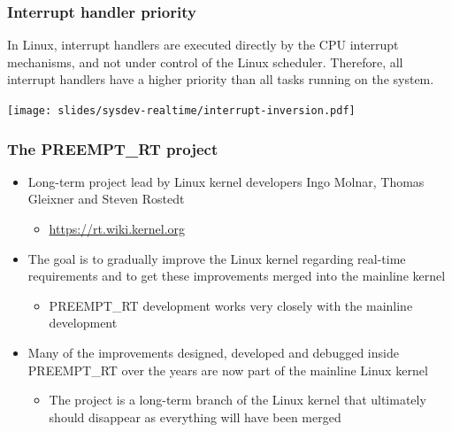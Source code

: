 \begin{frame}
  \frametitle{Interrupt handler priority}

  In Linux, interrupt handlers are executed directly by the CPU
  interrupt mechanisms, and not under control of the Linux
  scheduler. Therefore, all interrupt handlers have a higher priority
  than all tasks running on the system.

  \begin{center}
    \texttt{[image: slides/sysdev-realtime/interrupt-inversion.pdf]}
  \end{center}
\end{frame}

\begin{frame}
  \frametitle{The PREEMPT\_RT project}
  \begin{itemize}
  \item Long-term project lead by Linux kernel developers Ingo Molnar,
    Thomas Gleixner and Steven Rostedt
    \begin{itemize}
    \item \url{https://rt.wiki.kernel.org}
    \end{itemize}
  \item The goal is to gradually improve the Linux kernel regarding
    real-time requirements and to get these improvements merged into
    the mainline kernel
    \begin{itemize}
    \item PREEMPT\_RT development works very closely with the mainline
      development
    \end{itemize}
  \item Many of the improvements designed, developed and debugged
    inside PREEMPT\_RT over the years are now part of the mainline
    Linux kernel
    \begin{itemize}
    \item The project is a long-term branch of the Linux kernel that
      ultimately should disappear as everything will have been merged
    \end{itemize}
  \end{itemize}
\end{frame}

